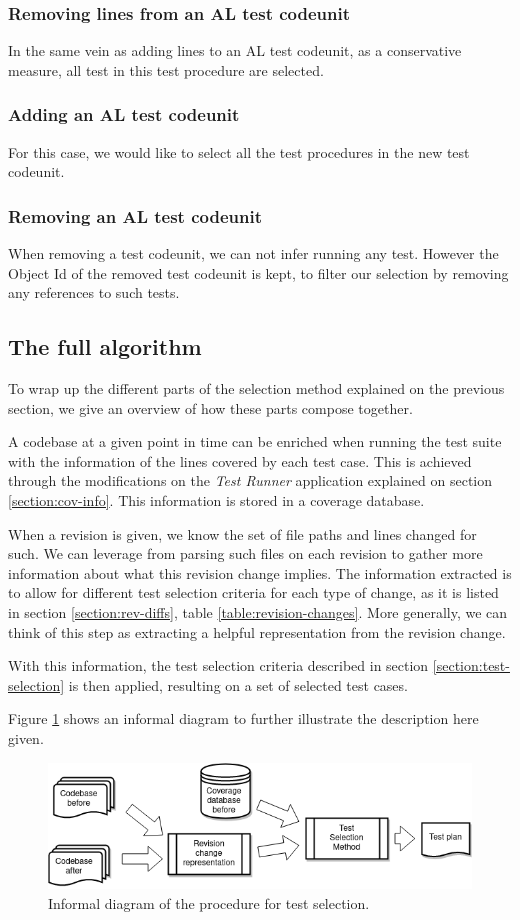 \documentclass{article}
\begin{document}
\subsubsection{Removing lines from an AL test codeunit}
In the same vein as adding lines to an AL test codeunit, as a conservative measure, all test in this test procedure are selected.
\subsubsection{Adding an AL test codeunit}
For this case, we would like to select all the test procedures in the new test codeunit.
\subsubsection{Removing an AL test codeunit}
When removing a test codeunit, we can not infer running any test. However the Object Id of the removed test codeunit is kept, to filter our selection by removing any references to such tests.
\subsection{The full algorithm}
To wrap up the different parts of the selection method explained on the previous section, we give an overview of how these parts compose together.

A codebase at a given point in time can be enriched when running the test suite with the information of the lines covered by each test case. This is achieved through the modifications on the \emph{Test Runner} application explained on section \ref{section:cov-info}. This information is stored in a coverage database.

When a revision is given, we know the set of file paths and lines changed for such. We can leverage from parsing such files on each revision to gather more information about what this revision change implies. The information extracted is to allow for different test selection criteria for each type of change, as it is listed in section \ref{section:rev-diffs}, table \ref{table:revision-changes}. More generally, we can think of this step as extracting a helpful representation from the revision change.

With this information, the test selection criteria described in section \ref{section:test-selection} is then applied, resulting on a set of selected test cases.

Figure \ref{fig:testselection} shows an informal diagram to further illustrate the description here given.
\begin{figure}[H]
  \includegraphics[width=\textwidth]{images/testselection.png}
  \caption{Informal diagram of the procedure for test selection.}
  \label{fig:testselection}
\end{figure}
\end{document}

